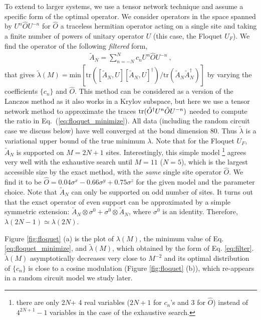 \documentclass[twocolumn,superscriptaddress, prb]{revtex4-1}
\begin{document}
To extend to larger systems, we use a tensor network technique and assume a specific form of the optimal operator.
We consider operators in the space spanned by $U^n \hat{O} U^{- n}$ for $\hat{O}$ a traceless hermitian operator acting on a single site
and taking a finite number of powers of unitary operator $U$ (this case, the Floquet $U_F$).
We find the operator of the following {\it filtered} form,
\begin{align}
 \tilde{A}_N=\sum_{n=-N}^N c_n U^n \hat{O} U^{- n} ~,
 \label{eq:filter}
\end{align}
that gives $\tilde{\lambda}(M) = \mathrm{min}\left[\mathrm{tr}([\tilde{A}_N,U][\tilde{A}_N,U]^\dag)/\mathrm{tr}(\tilde{A}_N\tilde{A}_N^\dag)\right]$
by varying the coefficients $\{c_n\}$ and $\hat{O}$.
This method can be considered as a version of the Lanczos method as it also works in a Krylov subspace,
but here we use a tensor network method to approximate the traces ${\rm tr}(\hat{O}^\dagger U^n \hat{O} U^{-n})$ needed to compute the ratio in Eq.~(\ref{eq:floquet_minimize}). All data (including the random circuit case we discuss below) have well converged at the bond dimension 80.
Thus $\tilde{\lambda}$ is a variational upper bound of the true minimum $\lambda$.
Note that for the Floquet $U_F$, $\tilde{A}_N$ is supported on $M = 2N+1$ sites.
Interestingly, this simple model \footnote{there are only 2$N$+ 4 real variables ($2N+1$ for $c_n$'s and 3 for $\hat{O}$) instead of $4^{2N+1} - 1$ variables
in the case of the exhaustive search.}
agrees very well with the exhaustive search until $M = 11$ ($N = 5$), which is the largest accessible size by the exact method,
with the {\it same} single site operator $\hat{O}$.
We find it to be $\hat{O} = 0.04\sigma^x  - 0.66\sigma^y + 0.75\sigma^z$ for the given model and the parameter choice.
Note that $\tilde{A}_N$ can only be supported on odd number of sites.
It turns out that the exact operator of even support can be approximated by a simple symmetric extension:
$\tilde{A}_N\otimes \sigma^0 + \sigma^0\otimes\tilde{A}_N$, where $\sigma^0$ is an identity.
Therefore, $\lambda(2N-1) \simeq \lambda(2N)$.


Figure \ref{fig:floquet} (a) is the plot of $\lambda (M)$, the minimum value of Eq. \ref{eq:floquet_minimize}, and
$\tilde{\lambda}(M)$, which obtained by the form of Eq. \eqref{eq:filter}.
$\tilde{\lambda}(M)$ asymptotically decreases very close to $M^{-2}$
and its optimal distribution of $\{ c_n\}$ is close to a cosine modulation (Figure \ref{fig:floquet} (b)),
which re-appears in a random circuit model we study later.
\end{document}
